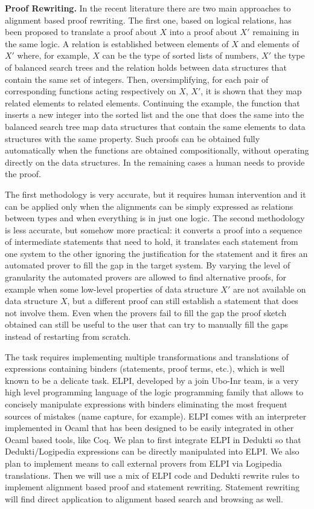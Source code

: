 \textbf{Proof Rewriting.} In the recent literature there are two main
approaches to alignment based proof rewriting. The first one, based on
logical relations, has been proposed to translate a proof about $X$
into a proof about $X'$ remaining in the same logic. A relation is
established between elements of $X$ and elements of $X'$ where, for
example, $X$ can be the type of sorted lists of numbers, $X'$ the type
of balanced search trees and the relation holds between data
structures that contain the same set of integers. Then,
oversimplifying, for each pair of corresponding functions acting
respectively on $X$, $X'$, it is shown that they map related elements
to related elements. Continuing the example, the function that inserts
a new integer into the sorted list and the one that does the same into
the balanced search tree map data structures that contain the same
elements to data structures with the same property. Such proofs can be
obtained fully automatically when the functions are obtained
compositionally, without operating directly on the data structures. In
the remaining cases a human needs to provide the proof.

The first methodology is very accurate, but it requires human
intervention and it can be applied only when the alignments can be
simply expressed as relations between types and when everything is in
just one logic. The second methodology is less accurate, but somehow
more practical: it converts a proof into a sequence of intermediate
statements that need to hold, it translates each statement from one
system to the other ignoring the justification for the statement and
it fires an automated prover to fill the gap in the target system. By
varying the level of granularity the automated provers are allowed to
find alternative proofs, for example when some low-level properties of
data structure $X'$ are not available on data structure $X$, but a
different proof can still establish a statement that does not involve
them. Even when the provers fail to fill the gap the proof sketch
obtained can still be useful to the user that can try to manually fill
the gaps instead of restarting from scratch.

The task requires implementing multiple transformations and
translations of expressions containing binders (statements, proof
terms, etc.), which is well known to be a delicate task. ELPI,
developed by a join Ubo-Inr team, is a very high level programming
language of the logic programming family that allows to concisely
manipulate expressions with binders eliminating the most frequent
sources of mistakes (name capture, for example). ELPI comes with an
interpreter implemented in Ocaml that has been designed to be easily
integrated in other Ocaml based tools, like Coq. We plan to first
integrate ELPI in Dedukti so that Dedukti/Logipedia expressions can be
directly manipulated into ELPI. We also plan to implement means to
call external provers from ELPI via Logipedia translations. Then we
will use a mix of ELPI code and Dedukti rewrite rules to implement
alignment based proof and statement rewriting. Statement rewriting
will find direct application to alignment based search and browsing as
well.

